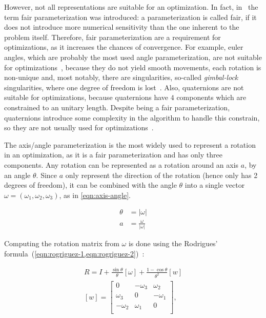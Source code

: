 However, not all representations are suitable for an optimization. In fact, in~\cite{hornegger99} the term fair parameterization was introduced: a parameterization is called fair, if it does not introduce more numerical sensitivity than the one inherent to the problem itself. Therefore, fair parameterization are a requirement for optimizations, as it increases the chances of convergence. For example, euler angles, which are probably the most used angle parameterization, are not suitable for optimizations~\cite{schmidt01}, because they do not yield smooth movements, each rotation is non-unique and, most notably, there are singularities, so-called \textit{gimbal-lock} singularities, where one degree of freedom is lost~\cite{schmidt01}. Also, quaternions are not suitable for optimizations, because quaternions have $4$ components which are constrained to an unitary length. Despite being a fair parameterization, quaternions introduce some complexity in the algorithm to handle this constrain, so they are not usually used for optimizations~\cite{schmidt01}.

The axis/angle parameterization is the most widely used to represent a rotation in an optimization, as it is a fair parameterization and has only three components. Any rotation can be represented as a rotation around an axis $a$, by an angle $\theta$. Since $a$ only represent the direction of the rotation (hence only has 2 degrees of freedom), it can be combined with the angle $\theta$ into a single vector $\omega = \left(\omega_1, \omega_2, \omega_3\right)$, as in \cref{eqn:axis-angle}.

\begin{equation}
    \label{eqn:axis-angle}
    \begin{aligned}
        \theta & = |\omega| \\
        a & = \frac{\omega}{|\omega|}
    \end{aligned}
\end{equation}

Computing the rotation matrix from $\omega$ is done using the Rodrigues' formula~(\cref{eqn:rogriguez-1,eqn:rogriguez-2})~\cite{schmidt01}:

\begin{align}
    \label{eqn:rogriguez-1}
    R = I + \frac{\sin \theta}{\theta} [\omega] + \frac{1 - \cos \theta}{\theta^2} [w] \\
    \label{eqn:rogriguez-2}
    [w] = \left[
        \begin{array}{ccc}
            0  & -\omega_3 & \omega_2 \\
            \omega_3 & 0   & -\omega_1 \\
            -\omega_2 & \omega_1 & 0 \\
        \end{array}
    \right],
\end{align}

